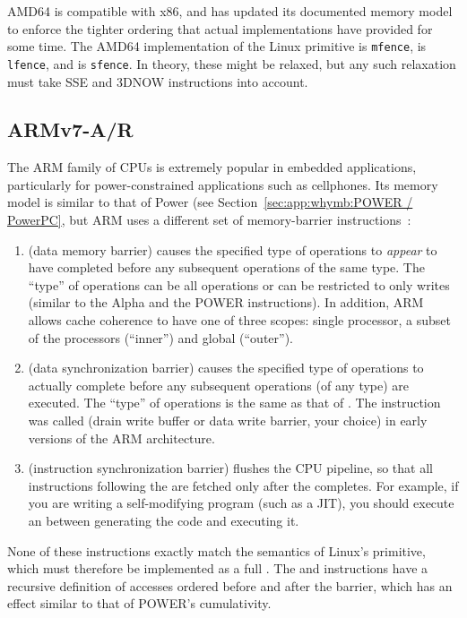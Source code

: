 AMD64 is compatible with x86, and has updated its documented memory
model~\cite{AMDOpteron:2:2007}
to enforce the tighter ordering that actual implementations have
provided for some time.
The AMD64 implementation of the Linux  primitive is {\tt mfence},
 is {\tt lfence}, and  is {\tt sfence}.
In theory, these might be relaxed, but any such relaxation must take
SSE and 3DNOW instructions into account.

\subsection{ARMv7-A/R}

The ARM family of CPUs is extremely popular in embedded applications,
particularly for power-constrained applications such as cellphones.
Its memory model is similar to that of Power
(see Section~\ref{sec:app:whymb:POWER / PowerPC}, but ARM uses a
different set of memory-barrier instructions~\cite{ARMv7A:2010}:

\begin{enumerate}
\item	{} (data memory barrier) causes the specified type of
	operations to \emph{appear} to have completed before any
	subsequent operations of the same type.
	The ``type'' of operations can be all operations or can be
	restricted to only writes (similar to the Alpha 
	and the POWER  instructions).
	In addition, ARM allows cache coherence to have one of three
	scopes: single processor, a subset of the processors
	(``inner'') and global (``outer'').
\item	{} (data synchronization barrier) causes the specified
	type of operations to actually complete before any subsequent
	operations (of any type) are executed.
	The ``type'' of operations is the same as that of .
	The  instruction was called  (drain write buffer
	or data write barrier, your choice) in early versions of the
	ARM architecture.
\item	{} (instruction synchronization barrier) flushes the CPU
	pipeline, so that all instructions following the 
	are fetched only after the  completes.
	For example, if you are writing a self-modifying program
	(such as a JIT), you should execute an  between
	generating the code and executing it.
\end{enumerate}

None of these instructions exactly match the semantics of Linux's
 primitive, which must therefore be implemented as a full
.
The  and  instructions have a recursive definition
of accesses ordered before and after the barrier, which has an effect
similar to that of POWER's cumulativity.

